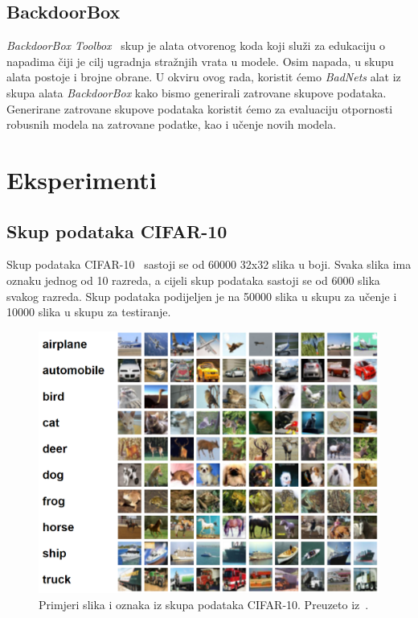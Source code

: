 \documentclass[times, utf8, zavrsni, numeric]{fer}
\begin{document}
\section{BackdoorBox}

\textit{BackdoorBox Toolbox}~\cite{li2023backdoorbox} skup je alata otvorenog koda koji služi za edukaciju o napadima čiji je cilj ugradnja stražnjih vrata u modele.
Osim napada, u skupu alata postoje i brojne obrane. U okviru ovog rada, koristit ćemo \textit{BadNets} alat iz skupa alata \textit{BackdoorBox} kako bismo generirali zatrovane skupove podataka.
Generirane zatrovane skupove podataka koristit ćemo za evaluaciju otpornosti robusnih modela na zatrovane podatke, kao i učenje novih modela.

\chapter{Eksperimenti}

\section{Skup podataka CIFAR-10}

Skup podataka CIFAR-10~\cite{krizhevsky2009learning} sastoji se od 60000 32x32 slika u boji. Svaka slika ima oznaku jednog od 10 razreda,
a cijeli skup podataka sastoji se od 6000 slika svakog razreda. Skup podataka podijeljen je na 50000 slika u skupu za učenje i 10000 slika u skupu za testiranje.

\begin{figure}[htb]
    \centering
    \includegraphics[scale=0.5]{cifar.png}
    \caption{Primjeri slika i oznaka iz skupa podataka CIFAR-10. Preuzeto iz~\cite{krizhevsky2009learning}.}
    \label{fig:cifar10}
\end{figure}
\end{document}
